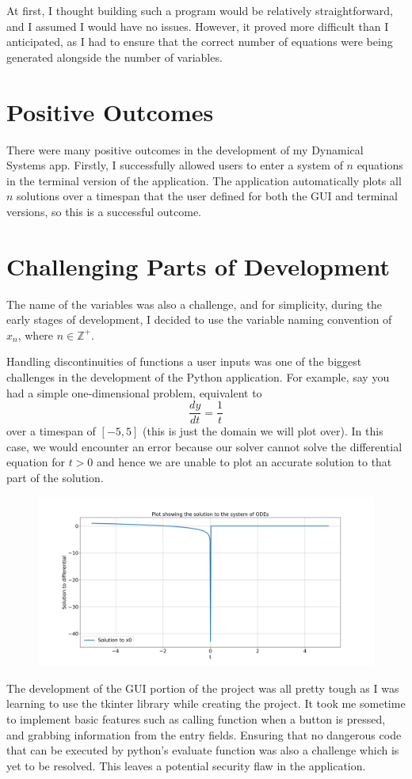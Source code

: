 \documentclass[12pt]{report}
\begin{document}
At first, I thought building such a program would be relatively straightforward, and I assumed I would have no issues. However, it proved more difficult than I anticipated, as I had to ensure that the correct number of equations were being generated alongside the number of variables. 
\section{Positive Outcomes}
There were many positive outcomes in the development of my Dynamical Systems app. Firstly, I successfully allowed users to enter a system of $n$ equations in the terminal version of the application. The application automatically plots all $n$ solutions over a timespan that the user defined for both the GUI and terminal versions, so this is a successful outcome.
\section{Challenging Parts of Development}
The name of the variables was also a challenge, and for simplicity, during the early stages of development, I decided to use the variable naming convention of $x_{n}$, where $n \in \mathbb{Z}^{+}$.
\smallskip

Handling discontinuities of functions a user inputs was one of the biggest challenges in the development of the Python application. For example, say you had a simple one-dimensional problem, equivalent to
\begin{equation*}
    \frac{dy}{dt} = \frac{1}{t} 
\end{equation*}
over a timespan of $[-5,5]$ (this is just the domain we will plot over). In this case, we would encounter an error because our solver cannot solve the differential equation for $t > 0$ and hence we are unable to plot an accurate solution to that part of the solution.
\begin{figure}[H]
    \centering
    \includegraphics[scale = 0.35]{Demo 5.png}
\end{figure}
The development of the GUI portion of the project was all pretty tough as I was learning to use the tkinter library while creating the project. It took me sometime to implement basic features such as calling function when a button is pressed, and grabbing information from the entry fields. Ensuring that no dangerous code that can be executed by python's evaluate function was also a challenge which is yet to be resolved. This leaves a potential security flaw in the application.
\smallskip
\end{document}
